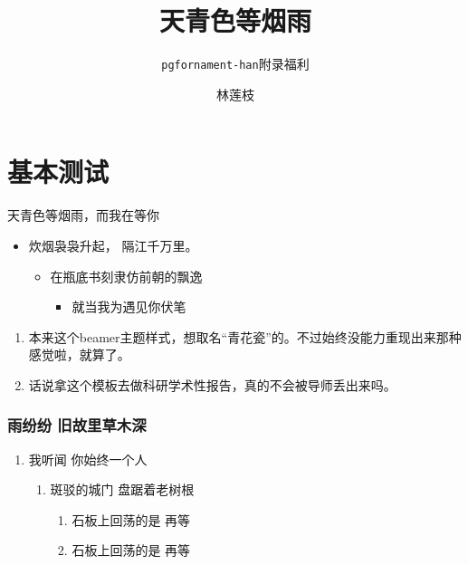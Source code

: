 \documentclass[aspectratio=1610,linespread=1.2]{ctexbeamer}
\title{天青色等烟雨}
\author{林莲枝}
\subtitle{\texttt{pgfornament-han}附录福利}
\begin{document}
\begin{frame}
\maketitle
\end{frame}

\begin{frame}{\contentsname}
\tableofcontents
\end{frame}


\section{基本测试}

\begin{frame}{天青色等烟雨，而我在等你}
    \begin{itemize}
        \item 炊烟袅袅升起， 隔江千万里。
        \begin{itemize}
	        \item 在瓶底书刻隶仿前朝的飘逸
	        \begin{itemize}
		        \item 就当我为遇见你伏笔
	        \end{itemize}
        \end{itemize}
    \end{itemize}

\begin{enumerate}
        \item 本来这个beamer主题样式，想取名“青花瓷”的。不过始终没能力重现出来那种感觉啦，就算了。
        \item 话说拿这个模板去做科研学术性报告，真的不会被导师丢出来吗。
\end{enumerate}
    
\end{frame}

\begin{frame}
\frametitle{雨纷纷 旧故里草木深}
    \begin{enumerate}
        \item 我听闻 你始终一个人
        \begin{enumerate}
	        \item 斑驳的城门 盘踞着老树根
	        \begin{enumerate}
		        \item 石板上回荡的是 再等
		        \item 石板上回荡的是 再等
	        \end{enumerate}
        \end{enumerate}
    \end{enumerate}

\end{frame}
\end{document}
